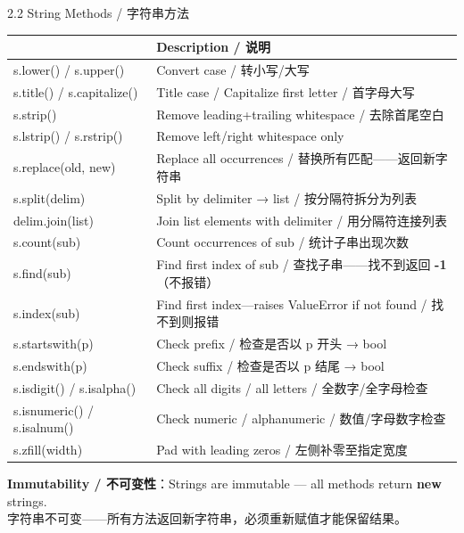 \documentclass[11pt,a4paper]{report}
\begin{document}
\begin{cmdsection}{2.2  String Methods / 字符串方法}
\normalsize\renewcommand{\arraystretch}{1.4}
\centering
\begin{tabularx}{\textwidth}{@{}>{\ttfamily}l>{\raggedright\arraybackslash}X@{}}
\toprule
\multicolumn{1}{@{}l}{\textbf{Method}} & \textbf{Description / 说明} \\ \midrule
s.lower() / s.upper()   & Convert case / 转小写/大写 \\
s.title() / s.capitalize() & Title case / Capitalize first letter / 首字母大写 \\
s.strip()               & Remove leading+trailing whitespace / 去除首尾空白 \\
s.lstrip() / s.rstrip() & Remove left/right whitespace only \\
s.replace(old, new)     & Replace all occurrences / 替换所有匹配——返回新字符串 \\
s.split(delim)          & Split by delimiter → list / 按分隔符拆分为列表 \\
delim.join(list)        & Join list elements with delimiter / 用分隔符连接列表 \\
s.count(sub)            & Count occurrences of sub / 统计子串出现次数 \\
s.find(sub)             & Find first index of sub / 查找子串——找不到返回 \textbf{-1}（不报错） \\
s.index(sub)            & Find first index—raises ValueError if not found / 找不到则报错 \\
s.startswith(p)         & Check prefix / 检查是否以 p 开头 → bool \\
s.endswith(p)           & Check suffix / 检查是否以 p 结尾 → bool \\
s.isdigit() / s.isalpha() & Check all digits / all letters / 全数字/全字母检查 \\
s.isnumeric() / s.isalnum() & Check numeric / alphanumeric / 数值/字母数字检查 \\
s.zfill(width)          & Pad with leading zeros / 左侧补零至指定宽度 \\
\bottomrule
\end{tabularx}
\medskip
\textbf{Immutability / 不可变性}：Strings are immutable — all methods return \textbf{new} strings.\\
字符串不可变——所有方法返回新字符串，必须重新赋值才能保留结果。
\end{cmdsection}
\end{document}
